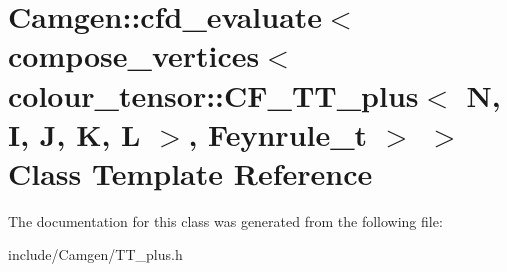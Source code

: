\hypertarget{a00051}{}\section{Camgen\+:\+:cfd\+\_\+evaluate$<$ compose\+\_\+vertices$<$ colour\+\_\+tensor\+:\+:C\+F\+\_\+\+T\+T\+\_\+plus$<$ N, I, J, K, L $>$, Feynrule\+\_\+t $>$ $>$ Class Template Reference}
\label{a00051}


The documentation for this class was generated from the following file\+:\begin{DoxyCompactItemize}
\item 
include/\+Camgen/T\+T\+\_\+plus.\+h\end{DoxyCompactItemize}
